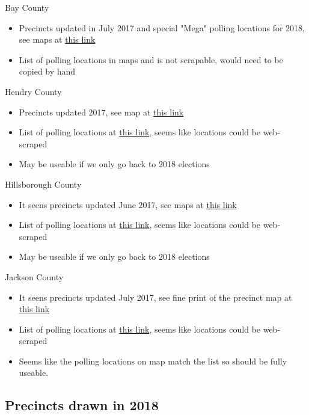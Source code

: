 \documentclass[12pt]{article}
\begin{document}
Bay County
\begin{itemize}
  \item Precincts updated in July 2017 and special "Mega" polling locations for 2018, see maps at \href{https://www.bayvotes.org/Voter-Info/Maps-and-Boundaries}{this link}
  \item List of polling locations in maps and is not scrapable, would need to be copied by hand
\end{itemize}
Hendry County
\begin{itemize}
  \item Precincts updated 2017, see map at \href{https://www.hendryelections.org/Portals/Hendry/2016-2018%20Precincts.pdf}{this link}
  \item List of polling locations at \href{https://www.voterfocus.com/PrecinctFinder/precinctDirectory?county=FL-HEN}{this link},  seems like locations could be web-scraped
  \item May be useable if we only go back to 2018 elections
\end{itemize}
Hillsborough County
\begin{itemize}
  \item It seens precincts updated June 2017, see maps at \href{https://www.votehillsborough.org/RESEARCH-DATA/MAPS-DISTRICTS-HBC-Indivudual-Maps}{this link}
  \item List of polling locations at \href{https://www.voterfocus.com/PrecinctFinder/precinctDirectory?county=FL-HIL}{this link},  seems like locations could be web-scraped
  \item May be useable if we only go back to 2018 elections
\end{itemize}
Jackson County
\begin{itemize}
  \item It seens precincts updated July 2017, see fine print of the precinct map at \href{https://www.jacksoncountysoe.org/Portals/Jackson/Documents/Accessibility%20PDF%20Fixes/Current_Precincts_07_18_2017FIXED.pdf?ver=2019-01-24-084548-780}{this link}
  \item List of polling locations at \href{https://www.voterfocus.com/PrecinctFinder/precinctDirectory?county=FL-JAC}{this link},  seems like locations could be web-scraped
  \item Seems like the polling locations on map match the list so should be fully useable.
\end{itemize}


\clearpage

\subsection{Precincts drawn in 2018}
\end{document}
